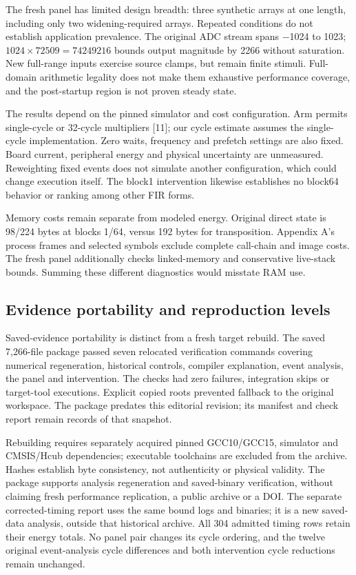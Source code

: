 \documentclass[conference]{IEEEtran}
\begin{document}
The fresh panel has limited design breadth: three synthetic arrays at
one length, including only two widening-required arrays. Repeated
conditions do not establish application prevalence. The original ADC
stream spans −1024 to 1023; \(1024\times72509=74249216\) bounds output
magnitude by 2266 without saturation. New full-range inputs exercise
source clamps, but remain finite stimuli. Full-domain arithmetic
legality does not make them exhaustive performance coverage, and the
post-startup region is not proven steady state.

The results depend on the pinned simulator and cost configuration. Arm
permits single-cycle or 32-cycle multipliers {[}11{]}; our cycle
estimate assumes the single-cycle implementation. Zero waits, frequency
and prefetch settings are also fixed. Board current, peripheral energy
and physical uncertainty are unmeasured. Reweighting fixed events does
not simulate another configuration, which could change execution itself.
The block1 intervention likewise establishes no block64 behavior or
ranking among other FIR forms.

Memory costs remain separate from modeled energy. Original direct state
is 98/224 bytes at blocks 1/64, versus 192 bytes for transposition.
Appendix A's process frames and selected symbols exclude complete
call-chain and image costs. The fresh panel additionally checks
linked-memory and conservative live-stack bounds. Summing these
different diagnostics would misstate RAM use.

\subsection{Evidence portability and reproduction levels}\label{evidence-portability-and-reproduction-levels}

Saved-evidence portability is distinct from a fresh target rebuild. The
saved 7,266-file package passed seven relocated verification commands
covering numerical regeneration, historical controls, compiler
explanation, event analysis, the panel and intervention. The checks had
zero failures, integration skips or target-tool executions. Explicit
copied roots prevented fallback to the original workspace. The package
predates this editorial revision; its manifest and check report remain
records of that snapshot.

Rebuilding requires separately acquired pinned GCC10/GCC15, simulator
and CMSIS/Hcub dependencies; executable toolchains are excluded from the
archive. Hashes establish byte consistency, not authenticity or physical
validity. The package supports analysis regeneration and saved-binary
verification, without claiming fresh performance replication, a public
archive or a DOI. The separate corrected-timing report uses the same
bound logs and binaries; it is a new saved-data analysis, outside that
historical archive. All 304 admitted timing rows retain their energy
totals. No panel pair changes its cycle ordering, and the twelve
original event-analysis cycle differences and both intervention cycle
reductions remain unchanged.
\end{document}
